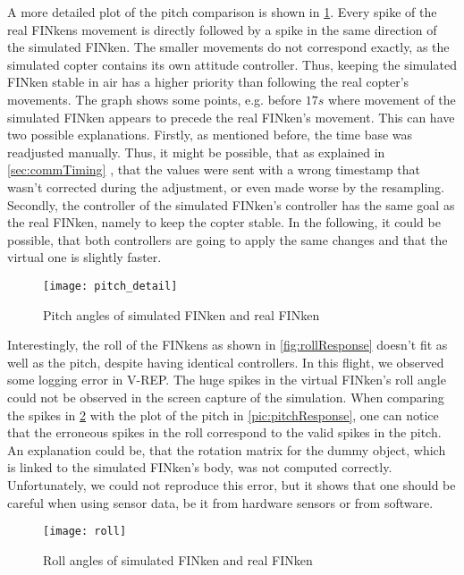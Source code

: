 A more detailed plot of the pitch comparison is shown in \ref{pic:pitchDetail}.
Every spike of the real FINkens movement is directly followed by a spike in the same direction of the simulated FINken.
The smaller movements do not correspond exactly, as the simulated copter contains its own attitude controller.
Thus, keeping the simulated FINken stable in air has a higher priority than following the real copter's movements.
The graph shows some points, e.g. before $17s$ where movement of the simulated FINken appears to precede the real FINken's movement.
This can have two possible explanations.
Firstly, as mentioned before, the time base was readjusted manually.
Thus, it might be possible, that as explained in \ref{sec:commTiming} , that the values were sent with a wrong timestamp that wasn't corrected during the adjustment, or even made worse by the resampling.
Secondly,  the controller of the simulated FINken's controller has the same goal as the real FINken, namely to keep the copter stable. 
In the following, it could be possible, that both controllers are going to apply the same changes and that the virtual one is slightly faster.
 

\begin{figure}
	\begin{center}
	\texttt{[image: pitch\_detail]}
	\caption{Pitch angles of simulated FINken and real FINken}
	\label{pic:pitchDetail}
	\end{center}
\end{figure}

Interestingly, the roll of the FINkens as shown in \ref{fig:rollResponse} doesn't fit as well as the pitch, despite having identical controllers.
In this flight, we observed some logging error in V-REP. 
The huge spikes in the virtual FINken's roll angle could not be observed in the screen capture of the simulation.
When comparing the spikes in \ref{pic:rollResponse} with the plot of the pitch in \ref{pic:pitchResponse}, one can notice that the erroneous spikes in the roll correspond to the valid spikes in the pitch.
An explanation could be, that the rotation matrix for the dummy object, which is linked to the simulated FINken's body, was not computed correctly.
Unfortunately, we could not reproduce this error, but it shows that one should be careful when using sensor data, be it from hardware sensors or from software.

\begin{figure}
	\begin{center}
	\texttt{[image: roll]}
	\caption{Roll angles of simulated FINken and real FINken}
	\label{pic:rollResponse}
	\end{center}
\end{figure}

